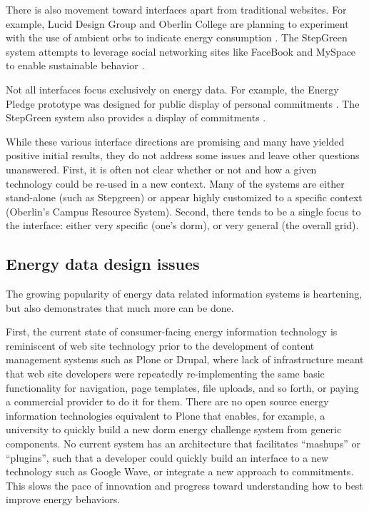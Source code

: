 There is also movement toward interfaces apart from traditional websites.
For example, Lucid Design Group and Oberlin College are planning to
experiment with the use of ambient orbs to indicate energy consumption
\cite{Peterson09}.  The StepGreen system attempts to leverage social
networking sites like FaceBook and MySpace to enable sustainable behavior
\cite{Mankoff07}.

Not all interfaces focus exclusively on energy data.  For example, the
Energy Pledge prototype was designed for public display of personal
commitments \cite{Pierce09}.  The StepGreen system also provides a display
of commitments \cite{StepGreen}.  

While these various interface directions are promising and many have
yielded positive initial results, they do not address some issues and leave
other questions unanswered. First, it is often not clear whether or not and
how a given technology could be re-used in a new context.  Many of the
systems are either stand-alone (such as Stepgreen) or appear highly
customized to a specific context (Oberlin's Campus Resource
System). Second, there tends to be a single focus to the interface: either
very specific (one's dorm), or very general (the overall grid).  

\subsection{Energy data design issues}

The growing popularity of energy data related information systems is
heartening, but also demonstrates that much more can be done. 

First, the current state of consumer-facing energy information technology
is reminiscent of web site technology prior to the development of content
management systems such as Plone or Drupal, where lack of infrastructure
meant that web site developers were repeatedly re-implementing the same
basic functionality for navigation, page templates, file uploads, and so
forth, or paying a commercial provider to do it for them.  There are no
open source energy information technologies equivalent to Plone that
enables, for example, a university to quickly build a new dorm energy
challenge system from generic components.  No current system has an
architecture that facilitates ``mashups'' or ``plugins'', such that a
developer could quickly build an interface to a new technology such as
Google Wave, or integrate a new approach to commitments. This slows the
pace of innovation and progress toward understanding how to best improve
energy behaviors.

